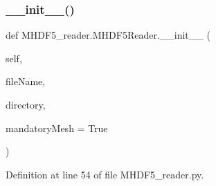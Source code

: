 \subsubsection{\texorpdfstring{\+\_\+\+\_\+init\+\_\+\+\_\+()}{\_\_init\_\_()}}
{\footnotesize\ttfamily def M\+H\+D\+F5\+\_\+reader.\+M\+H\+D\+F5\+Reader.\+\_\+\+\_\+init\+\_\+\+\_\+ (\begin{DoxyParamCaption}\item[{}]{self,  }\item[{}]{file\+Name,  }\item[{}]{directory,  }\item[{}]{mandatory\+Mesh = {\ttfamily True} }\end{DoxyParamCaption})}



Definition at line 54 of file M\+H\+D\+F5\+\_\+reader.\+py.


